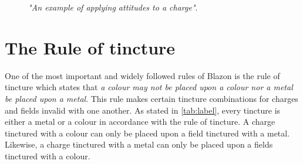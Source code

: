 \begin{figure}[H]
\hfill
{}
\hfill
\caption{\emph{"An example of applying attitudes to a charge"}.}

\end{figure}



\section{The Rule of tincture}
One of the most important and widely followed rules of Blazon is the rule of tincture which states that \emph{a colour may not be placed upon a colour nor a metal be placed upon a metal}\cite[p.46]{ruleoftincture}.  This rule makes certain tincture combinations for charges and fields invalid with one another.  As stated in \ref{tab:label}, every tincture is either a metal or a colour in accordance with the rule of tincture. A charge tinctured with a colour can only be placed upon a field tinctured with a metal.  Likewise, a charge tinctured with a metal can only be placed upon a fields tinctured with a colour.  

